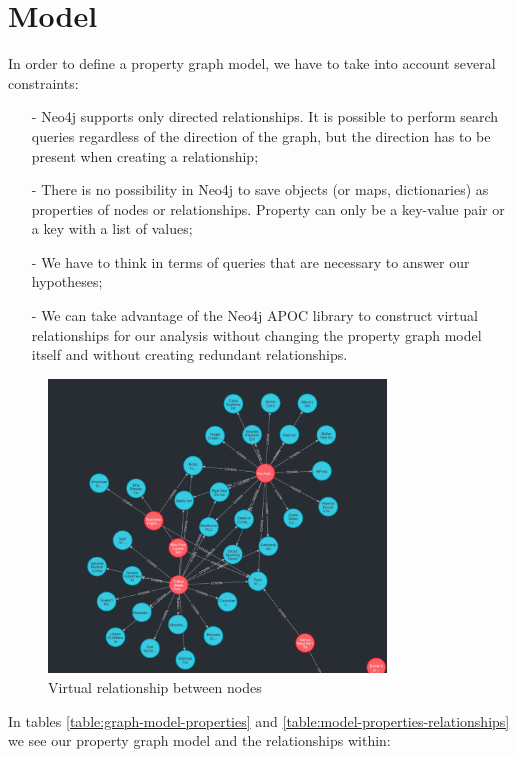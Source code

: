 \chapter{Model}
\label{cha:model}

In order to define a property graph model, we have to take into account several constraints:

\begin{itemize}
\item[-] Neo4j supports only directed relationships. It is possible to perform search queries regardless of the direction of the graph, but the direction has to be present when creating a relationship;
\item[-] There is no possibility in Neo4j to save objects (or maps, dictionaries) as properties of nodes or relationships. Property can only be a key-value pair or a key with a list of values;
\item[-] We have to think in terms of queries that are necessary to answer our hypotheses;
\item[-] We can take advantage of the Neo4j APOC library to construct virtual relationships for our analysis without changing the property graph model itself and without creating redundant relationships.
\end{itemize}

\begin{figure}[h]
 \centering
 \includegraphics[width=0.8\textwidth]{images/virtual-relationship-between-nodes.png}
 \caption{Virtual relationship between nodes }
 \label{fig:virtual-relationship-nodes}
\end{figure}


\noindent In tables \ref{table:graph-model-properties} and \ref{table:model-properties-relationships} we see our property graph model and the relationships within:

